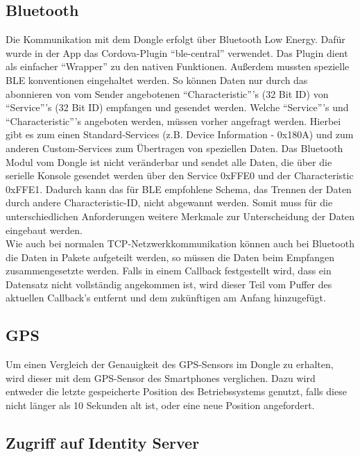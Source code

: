 \subsection{Bluetooth}
\label{sec:appBluetooth}

Die Kommunikation mit dem Dongle erfolgt über Bluetooth Low Energy. Dafür wurde in der App das Cordova-Plugin \enquote{ble-central} verwendet. Das Plugin dient als einfacher \enquote{Wrapper} zu den nativen Funktionen. Außerdem mussten spezielle BLE konventionen eingehaltet werden. So können Daten nur durch das abonnieren von vom Sender angebotenen \enquote{Characteristic}'s (32 Bit ID) von \enquote{Service}'s (32 Bit ID) empfangen und gesendet werden. Welche \enquote{Service}'s und \enquote{Characteristic}'s angeboten werden, müssen vorher angefragt  werden. Hierbei gibt es zum einen Standard-Services (z.B. Device Information - 0x180A) und zum anderen Custom-Services zum Übertragen von speziellen Daten. Das Bluetooth Modul vom Dongle ist nicht veränderbar und sendet alle Daten, die über die serielle Konsole gesendet werden über den Service 0xFFE0 und der Characteristic 0xFFE1. Dadurch kann das für BLE empfohlene Schema, das Trennen der Daten durch andere Characteristic-ID, nicht abgewannt werden. Somit muss für die unterschiedlichen Anforderungen weitere Merkmale zur Unterscheidung der Daten eingebaut werden. 
\\
Wie auch bei normalen TCP-Netzwerkkommunikation können auch bei Bluetooth die Daten in Pakete aufgeteilt werden, so müssen die Daten beim Empfangen zusammengesetzte werden. Falls in einem Callback festgestellt wird, dass ein Datensatz nicht vollständig angekommen ist, wird dieser Teil vom Puffer des aktuellen Callback's entfernt und dem zukünftigen am Anfang hinzugefügt.

\subsection{GPS}
\label{sec:appGPS}

Um einen Vergleich der Genauigkeit des GPS-Sensors im Dongle zu erhalten, wird dieser mit dem GPS-Sensor des Smartphones verglichen. Dazu wird entweder die letzte gespeicherte Position des Betriebssystems genutzt, falls diese nicht länger als 10 Sekunden alt ist, oder eine neue Position angefordert.

\subsection{Zugriff auf Identity Server}

